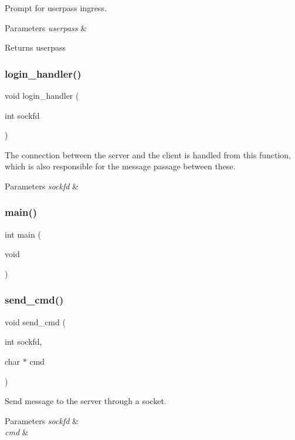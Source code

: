Prompt for userpass ingress. 


\begin{DoxyParams}{Parameters}
{\em userpass} & \\
\hline
\end{DoxyParams}
\begin{DoxyReturn}{Returns}
userpass 
\end{DoxyReturn}
\mbox{\label{client_8c_a471ae164131962c0fe21a47e23706139}} 
\subsubsection{login\+\_\+handler()}
{\footnotesize\ttfamily void login\+\_\+handler (\begin{DoxyParamCaption}\item[{int}]{sockfd }\end{DoxyParamCaption})}



The connection between the server and the client is handled from this function, which is also responsible for the message passage between these. 


\begin{DoxyParams}{Parameters}
{\em sockfd} & \\
\hline
\end{DoxyParams}
\mbox{\label{client_8c_ae66f6b31b5ad750f1fe042a706a4e3d4}} 
\subsubsection{main()}
{\footnotesize\ttfamily int main (\begin{DoxyParamCaption}\item[{void}]{ }\end{DoxyParamCaption})}

\mbox{\label{client_8c_a4117102389756aee8467678b28f484ed}} 
\subsubsection{send\+\_\+cmd()}
{\footnotesize\ttfamily void send\+\_\+cmd (\begin{DoxyParamCaption}\item[{int}]{sockfd,  }\item[{char $\ast$}]{cmd }\end{DoxyParamCaption})}



Send message to the server through a socket. 


\begin{DoxyParams}{Parameters}
{\em sockfd} & \\
\hline
{\em cmd} & \\
\hline
\end{DoxyParams}
